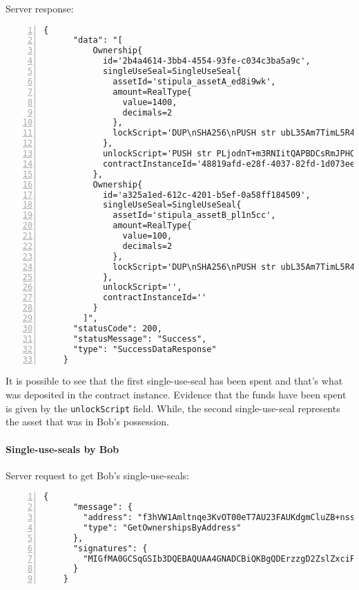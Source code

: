 Server response:
{
  \small
  \begin{Verbatim}[numbers=left,xleftmargin=1cm,firstnumber=1,breaklines=true,breakanywhere=true,tabsize=2]
    {
      "data": "[
          Ownership{
            id='2b4a4614-3bb4-4554-93fe-c034c3ba5a9c', 
            singleUseSeal=SingleUseSeal{
              assetId='stipula_assetA_ed8i9wk', 
              amount=RealType{
                value=1400, 
                decimals=2
              }, 
              lockScript='DUP\nSHA256\nPUSH str ubL35Am7TimL5R4oMwm2OxgAYA3XT3BeeDE56oxqdLc=\nEQUAL\nCHECKSIG\nHALT\n'
            }, 
            unlockScript='PUSH str PLjodnT+m3RNIitQAPBDCsRmJPHCqrwZOY/CPiHFZGnl+DRN6soqxMy3ehTFaUwxBjjf7qfBfvTDq5oBItTFrtz1Rn5SDS1ybdbkwpKaOXVglNOw7ZEG9bbZ1mo1oA7IAjRiIilzUetCstE5rPZIf9XOXr/RQ5AHkZUn2CztsvA=\nPUSH str MIGfMA0GCSqGSIb3DQEBAQUAA4GNADCBiQKBgQCo/GjVKS+3gAA55+kko41yINdOcCLQMSBQyuTTkKHE1mhu/TgOpivM0wLPsSga8hQMr3+v3aR0IF/vfCRf6SdiXmWx/jflmEXtnT6fkGcnV6dGNUpHWXSpwUIDt0N88jfnEqekx4S+KDCKg99sGEeHeT65fKS8lB0gjHMt9AOriwIDAQAB\n', 
            contractInstanceId='48819afd-e28f-4037-82fd-1d073ee1d318'
          }, 
          Ownership{
            id='a325a1ed-612c-4201-b5ef-0a58ff184509', 
            singleUseSeal=SingleUseSeal{
              assetId='stipula_assetB_pl1n5cc', 
              amount=RealType{
                value=100, 
                decimals=2
              }, 
              lockScript='DUP\nSHA256\nPUSH str ubL35Am7TimL5R4oMwm2OxgAYA3XT3BeeDE56oxqdLc=\nEQUAL\nCHECKSIG\nHALT\n'
            }, 
            unlockScript='', 
            contractInstanceId=''
          }
        ]",
      "statusCode": 200,
      "statusMessage": "Success",
      "type": "SuccessDataResponse"
    }
  \end{Verbatim}
}

It is possible to see that the first single-use-seal has been spent and that's what was deposited in the 
contract instance. Evidence that the funds have been spent is given by the \verb|unlockScript| field. 
While, the second single-use-seal represents the asset that was in Bob's possession.

\paragraph{Single-use-seals by Bob}

Server request to get Bob's single-use-seals:
{
  \small
  \begin{Verbatim}[numbers=left,xleftmargin=1cm,firstnumber=1,breaklines=true,breakanywhere=true,tabsize=2]
    {
      "message": {
        "address": "f3hVW1Amltnqe3KvOT00eT7AU23FAUKdgmCluZB+nss=",
        "type": "GetOwnershipsByAddress"
      },
      "signatures": {
        "MIGfMA0GCSqGSIb3DQEBAQUAA4GNADCBiQKBgQDErzzgD2ZslZxciFAiX3/ot7lrkZDw4148jFZrsDZPE6CVs9xXFSHGgy/mFvIFLXhnChO6Nyd2be3lbgeavLMCMVUiTStXr117Km17keWpb3sItkKKsLFBOcIIU8XXowI/OhzQN2XPZYESHgjdQ5vwEj2YyueiS7WKP94YWz/pswIDAQAB": "hSNodnUyusffNlv+KNq4605pFvqh91pVspFhTgbmWccE/LKM6h4bedpvTgMHoVDezvA7v2XTzmLG5eL3lOeA6I2xJMH32DcV60IPSoh61oVHnwPQcQHY039D4y5VSJ0GMQJKIcTEq3fqIdabg7261xUaegHUnXrcyynh9GpMJxk="
      }
    }
  \end{Verbatim}
}

